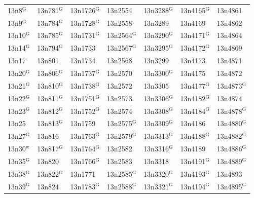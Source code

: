 \documentclass[12pt, oneside]{amsart}
\begin{document}
{\begin{longtable}{*{7}{>{\raggedright\arraybackslash}p{}}}
13n8$^{\mathrm{G}}$ & 13n781$^{\mathrm{G}}$ & 13n1726$^{\mathrm{G}}$ & 13n2554 & 13n3288$^{\mathrm{G}}$ & 13n4165$^{\mathrm{G}}$ & 13n4861 \\
13n9$^{\mathrm{G}}$ & 13n784$^{\mathrm{G}}$ & 13n1728$^{\mathrm{G}}$ & 13n2558 & 13n3289 & 13n4169 & 13n4862 \\
13n10$^{\mathrm{G}}$ & 13n785$^{\mathrm{G}}$ & 13n1731$^{\mathrm{G}}$ & 13n2564$^{\mathrm{G}}$ & 13n3290$^{\mathrm{G}}$ & 13n4171$^{\mathrm{G}}$ & 13n4864 \\
13n14$^{\mathrm{G}}$ & 13n794$^{\mathrm{G}}$ & 13n1733 & 13n2567$^{\mathrm{G}}$ & 13n3295$^{\mathrm{G}}$ & 13n4172$^{\mathrm{G}}$ & 13n4869 \\
13n17 & 13n801 & 13n1734 & 13n2568 & 13n3299 & 13n4173 & 13n4871 \\
13n20$^{\mathrm{G}}$ & 13n806$^{\mathrm{G}}$ & 13n1737$^{\mathrm{G}}$ & 13n2570 & 13n3300$^{\mathrm{G}}$ & 13n4175 & 13n4872 \\
13n21$^{\mathrm{G}}$ & 13n810$^{\mathrm{G}}$ & 13n1738$^{\mathrm{G}}$ & 13n2572 & 13n3305 & 13n4177$^{\mathrm{G}}$ & 13n4873$^{\mathrm{G}}$ \\
13n22$^{\mathrm{G}}$ & 13n811$^{\mathrm{G}}$ & 13n1751$^{\mathrm{G}}$ & 13n2573 & 13n3306$^{\mathrm{G}}$ & 13n4182$^{\mathrm{G}}$ & 13n4874 \\
13n23$^{\mathrm{G}}$ & 13n812$^{\mathrm{G}}$ & 13n1752$^{\mathrm{G}}$ & 13n2574 & 13n3308$^{\mathrm{G}}$ & 13n4184$^{\mathrm{G}}$ & 13n4878$^{\mathrm{G}}$ \\
13n25 & 13n813$^{\mathrm{G}}$ & 13n1759 & 13n2575$^{\mathrm{G}}$ & 13n3309$^{\mathrm{G}}$ & 13n4186 & 13n4880$^{\mathrm{G}}$ \\
13n27$^{\mathrm{G}}$ & 13n816 & 13n1763$^{\mathrm{G}}$ & 13n2579$^{\mathrm{G}}$ & 13n3313$^{\mathrm{G}}$ & 13n4188$^{\mathrm{G}}$ & 13n4882$^{\mathrm{G}}$ \\
13n30$^{\mathrm{w}}$ & 13n817$^{\mathrm{G}}$ & 13n1764$^{\mathrm{G}}$ & 13n2582 & 13n3316$^{\mathrm{G}}$ & 13n4189 & 13n4886$^{\mathrm{G}}$ \\
13n35$^{\mathrm{G}}$ & 13n820 & 13n1766$^{\mathrm{G}}$ & 13n2583 & 13n3318 & 13n4191$^{\mathrm{G}}$ & 13n4889$^{\mathrm{G}}$ \\
13n38$^{\mathrm{G}}$ & 13n822$^{\mathrm{G}}$ & 13n1771 & 13n2585$^{\mathrm{G}}$ & 13n3320$^{\mathrm{G}}$ & 13n4193$^{\mathrm{G}}$ & 13n4893 \\
13n39$^{\mathrm{G}}$ & 13n824 & 13n1783$^{\mathrm{G}}$ & 13n2588$^{\mathrm{G}}$ & 13n3321$^{\mathrm{G}}$ & 13n4194$^{\mathrm{G}}$ & 13n4895$^{\mathrm{G}}$ \\

\end{longtable}}
\end{document}
